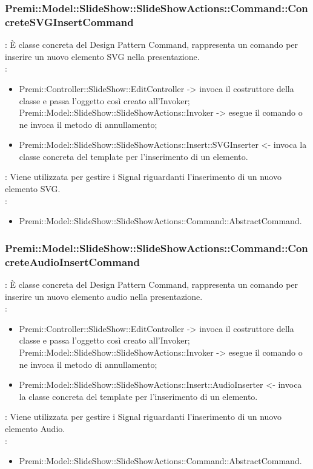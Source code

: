 {                    \subsubsection{Premi::Model::SlideShow::SlideShowActions::Command::ConcreteSVGInsertCommand}{
				\textbf{\tipo}: È classe concreta del Design Pattern Command, rappresenta un comando per inserire un nuovo elemento SVG nella presentazione.\\	
				\textbf{\relaz}: 
				\begin{itemize}
					\item Premi::Controller::SlideShow::EditController -> invoca il costruttore della classe e passa l’oggetto così creato all’Invoker;
Premi::Model::SlideShow::SlideShowActions::Invoker -> esegue il comando o ne invoca il metodo di annullamento;
                    \item Premi::Model::SlideShow::SlideShowActions::Insert::SVGInserter <- invoca la classe concreta del template per l’inserimento di un elemento.
				\end{itemize}	
                \textbf{\interfacce}: Viene utilizzata per gestire i Signal riguardanti l’inserimento di un nuovo elemento SVG.\\
                \textbf{\base}: 
                    \begin{itemize}
                    \item Premi::Model::SlideShow::SlideShowActions::Command::AbstractCommand.
                    \end{itemize}
                    }
                \subsubsection{Premi::Model::SlideShow::SlideShowActions::Command::ConcreteAudioInsertCommand}{
				\textbf{\tipo}: È classe concreta del Design Pattern Command, rappresenta un comando per inserire un nuovo elemento audio nella presentazione.\\	
				\textbf{\relaz}: 
				\begin{itemize}
					\item Premi::Controller::SlideShow::EditController -> invoca il costruttore della classe e passa l’oggetto così creato all’Invoker;
Premi::Model::SlideShow::SlideShowActions::Invoker -> esegue il comando o ne invoca il metodo di annullamento;
                    \item Premi::Model::SlideShow::SlideShowActions::Insert::AudioInserter <- invoca la classe concreta del template per l’inserimento di un elemento.
				\end{itemize}	
                \textbf{\interfacce}: Viene utilizzata per gestire i Signal riguardanti l’inserimento di un nuovo elemento Audio.\\
                \textbf{\base}: 
                    \begin{itemize}
                    \item Premi::Model::SlideShow::SlideShowActions::Command::AbstractCommand.
                    \end{itemize}
                    }
}
